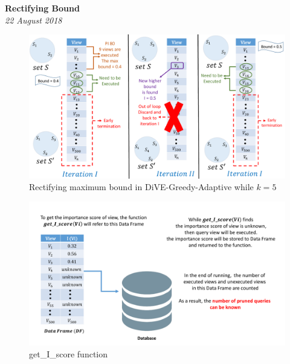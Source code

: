 \documentclass{article}
\begin{document}
\begin{titlepage}
	\begin{center}
		\Large\textbf{Rectifying Bound}\\
		\large\textit{22 August 2018}
	\end{center}
\end{titlepage}













\begin{figure}
	\begin{center}
		\includegraphics[width=7.0in]{figures/rectify_logic}
		\vspace{-8pt}
		\caption{Rectifying maximum bound in DiVE-Greedy-Adaptive while $k = 5$}
		\label{fig:rectify_logic}
		
	\end{center}
\end{figure}

\begin{figure}
	\begin{center}
		\includegraphics[width=7.0in]{figures/get_I_score}
		\vspace{-8pt}
		\caption{get\_I\_score function}
		\label{fig:getIscore}
		
	\end{center}
\end{figure}
\end{document}
